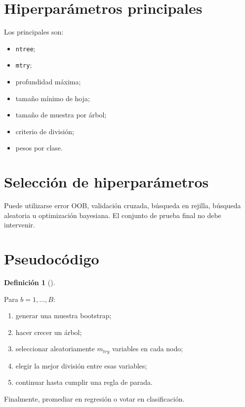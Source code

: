 \documentclass[
  spanish,
  10.5pt,
  letterpaper,
  DIV=11,
  numbers=noendperiod,
  oneside,
  open=any]{scrreprt}
\providecommand{\tightlist}{%
  \setlength{\itemsep}{0pt}\setlength{\parskip}{0pt}}
\theoremstyle{definition}
\newtheorem{definition}{Definición}[chapter]
\theoremstyle{definition}
\theoremstyle{plain}
\theoremstyle{remark}
\begin{document}
\section*{Hiperparámetros
principales}\label{hiperparuxe1metros-principales}


Los principales son:

\begin{itemize}
\tightlist
\item
  \texttt{ntree};
\item
  \texttt{mtry};
\item
  profundidad máxima;
\item
  tamaño mínimo de hoja;
\item
  tamaño de muestra por árbol;
\item
  criterio de división;
\item
  pesos por clase.
\end{itemize}

\section*{Selección de
hiperparámetros}\label{selecciuxf3n-de-hiperparuxe1metros-1}


Puede utilizarse error OOB, validación cruzada, búsqueda en rejilla,
búsqueda aleatoria u optimización bayesiana. El conjunto de prueba final
no debe intervenir.

\section*{Pseudocódigo}\label{pseudocuxf3digo-1}


\begin{definition}[]\protect\hypertarget{def-pseudocodigo-rf}{}\label{def-pseudocodigo-rf}

Para \(b=1,\ldots,B\):

\begin{enumerate}
\def\labelenumi{\arabic{enumi}.}
\tightlist
\item
  generar una muestra bootstrap;
\item
  hacer crecer un árbol;
\item
  seleccionar aleatoriamente \(m_{try}\) variables en cada nodo;
\item
  elegir la mejor división entre esas variables;
\item
  continuar hasta cumplir una regla de parada.
\end{enumerate}

Finalmente, promediar en regresión o votar en clasificación.

\end{definition}
\end{document}
